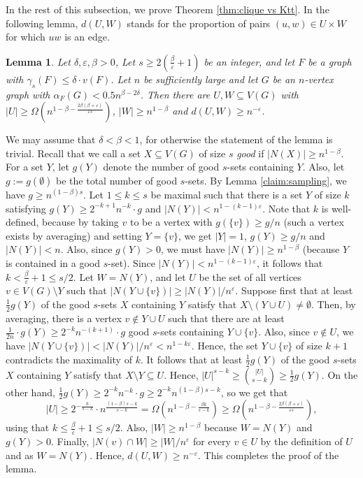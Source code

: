 \documentclass[11pt]{article}
\let\oldendproof\endproof
\renewenvironment{proof}[1][\proofname]{\oldproof[\bf #1]}{\oldendproof}
\theoremstyle{plain}
\newtheorem{lemma}[theorem]{Lemma}
\theoremstyle{definition}
\begin{document}
    In the rest of this subsection, we prove Theorem \ref{thm:clique vs Ktt}.
	In the following lemma, $d(U,W)$ stands for the proportion of pairs $(u,w)\in U\times W$ for which $uw$ is an edge.
	\begin{lemma}\label{lem:main}
		Let $\delta,\varepsilon,\beta > 0$, Let $s \geq 2(\frac{\beta}{\varepsilon} + 1)$ be an integer, and let $F$ be a graph with $\gamma_s(F) \leq \delta \cdot v(F)$.
		Let $n$ be sufficiently large and let $G$ be an $n$-vertex graph with $\alpha_F(G) < 0.5n^{\beta-2\delta}$. Then there are 
		$U,W \subseteq V(G)$ with $|U| \geq \Omega(n^{1-\beta - \frac{2\beta(\beta+\varepsilon)}{\varepsilon s}})$, $|W| \geq n^{1-\beta}$ and $d(U,W) \geq n^{-\varepsilon}$. 
	\end{lemma} 
	\begin{proof}
		We may assume that $\delta<\beta<1$, for otherwise the statement of the lemma is trivial. Recall that we call a set $X \subseteq V(G)$ of size $s$ {\em good} if $|N(X)| \geq n^{1-\beta}$. For a set $Y$, let $g(Y)$ denote the number of good $s$-sets containing $Y$. Also, let $g := g(\emptyset)$ be the total number of good $s$-sets. By Lemma \ref{claim:sampling}, we have $g \geq n^{(1-\beta)s}$. 
		Let $1 \leq k \leq s$ be maximal such that there is a set $Y$ of size $k$ satisfying $g(Y) \geq 2^{-k+1} n^{-k} \cdot g$ and $|N(Y)| < n^{1-(k-1)\varepsilon}$. 
		Note that $k$ is well-defined, because by taking $v$ to be a vertex with $g(\{v\}) \geq g/n$ (such a vertex exists by averaging) and setting $Y = \{v\}$, we get $|Y| = 1$, $g(Y) \geq g/n$ and $|N(Y)| < n$. 
		Also, since $g(Y) > 0$, we must have $|N(Y)| \geq n^{1-\beta}$ (because $Y$ is contained in a good $s$-set). Since $|N(Y)| < n^{1-(k-1)\varepsilon}$, it follows that $k < \frac{\beta}{\varepsilon}+1 \leq s/2$. 
		Let $W = N(Y)$, and let $U$ be the set of all vertices $v\in V(G)\setminus Y$ such that 
		$|N(Y \cup \{v\})| \geq |N(Y)|/n^{\varepsilon}$. Suppose first that at least $\frac{1}{2}g(Y)$ of the good $s$-sets $X$ containing $Y$ satisfy that $X \setminus (Y \cup U) \neq \emptyset$. Then, by averaging, there is a vertex $v \notin Y \cup U$ such that there are at least 
		$\frac{1}{2n} \cdot g(Y) \geq 2^{-k} n^{-(k+1)} \cdot g$ good $s$-sets containing $Y \cup \{v\}$. Also, since $v \notin U$, we have
		$|N(Y \cup \{v\})| < |N(Y)|/n^{\varepsilon} < n^{1-k\varepsilon}$. Hence, the set $Y \cup \{v\}$ of size $k+1$ contradicts the maximality of $k$. It follows that at least $\frac{1}{2}g(Y)$ of the good $s$-sets $X$ containing $Y$ satisfy that $X \setminus Y \subseteq U$. 
		Hence, $|U|^{s-k} \geq \binom{|U|}{s-k} \geq \frac{1}{2}g(Y)$.
		On the other hand, 
		$\frac{1}{2}g(Y) \geq 2^{-k} n^{-k} \cdot g \geq 2^{-k} n^{(1-\beta)s - k}$, so we get that 
		$$
		|U| \geq 2^{-\frac{k}{s-k}} \cdot n^{\frac{(1-\beta)s-k}{s-k}} = \Omega(n^{1-\beta - \frac{\beta k}{s-k}}) \geq 
		\Omega(n^{1-\beta - \frac{2\beta(\beta+\varepsilon)}{\varepsilon s}}),
		$$
		using that $k \leq \frac{\beta}{\varepsilon} + 1 \leq s/2$. 
		Also, $|W| \geq n^{1-\beta}$ because $W = N(Y)$ and $g(Y) > 0$. 
		Finally, $|N(v)\cap W| \geq |W|/n^{\varepsilon}$ for every $v \in U$ by the definition of $U$ and as $W = N(Y)$. Hence,
		$d(U,W) \geq n^{-\varepsilon}$. This completes the proof of the lemma. 
	\end{proof}
\end{document}
